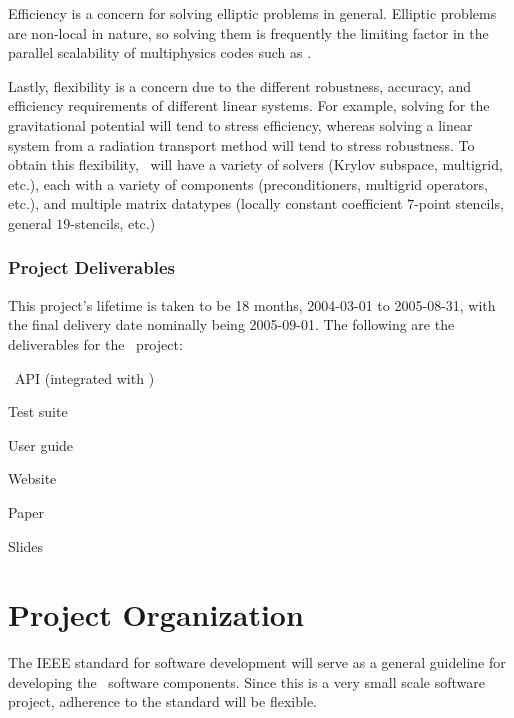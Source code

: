 \documentclass[11pt]{article}
\begin{document}
Efficiency is a concern for solving elliptic problems in general.
Elliptic problems are non-local in nature, so solving them is
frequently the limiting factor in the parallel scalability of
multiphysics codes such as \enzo.

Lastly, flexibility is a concern due to the different robustness,
accuracy, and efficiency requirements of different linear systems.
For example, solving for the gravitational potential will tend to
stress efficiency, whereas solving a linear system from a radiation
transport method will tend to stress robustness.  To obtain this
flexibility, \amrSolve\ will have a variety of solvers (Krylov
subspace, multigrid, etc.), each with a variety of components
(preconditioners, multigrid operators, etc.), and multiple matrix
datatypes (locally constant coefficient $7$-point stencils, general
$19$-stencils, etc.)

\subsubsection{Project Deliverables}

This project's lifetime is taken to be 18 months, 2004-03-01 to
2005-08-31, with the final delivery date nominally being 2005-09-01.
The following are the deliverables for the \amrSolve\ project:

%
\BeginDESCRIPTION
  \item [\Label{D1:} ] \amrSolve\ API (integrated with \enzo)
  \item [\Label{D2:} ] Test suite
  \item [\Label{D3:} ] User guide 
  \item [\Label{D4:} ] Website 
  \item [\Label{D5:} ] Paper 
  \item [\Label{D6:} ] Slides
\EndDESCRIPTION
   

\section{Project Organization}

The IEEE standard for software development will serve as a general
guideline for developing the \amrSolve\ software components.  Since this
is a very small scale software project, adherence to the standard will
be flexible.
\end{document}
